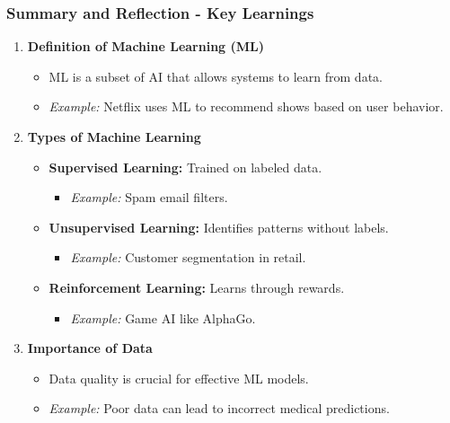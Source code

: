 \documentclass[aspectratio=169]{beamer}
\begin{document}
\begin{frame}[fragile]
  \frametitle{Summary and Reflection - Key Learnings}
  
  \begin{enumerate}
    \item \textbf{Definition of Machine Learning (ML)}
      \begin{itemize}
        \item ML is a subset of AI that allows systems to learn from data.
        \item \textit{Example:} Netflix uses ML to recommend shows based on user behavior.
      \end{itemize}
    
    \item \textbf{Types of Machine Learning}
      \begin{itemize}
        \item \textbf{Supervised Learning:} Trained on labeled data.
          \begin{itemize}
            \item \textit{Example:} Spam email filters.
          \end{itemize}
        \item \textbf{Unsupervised Learning:} Identifies patterns without labels.
          \begin{itemize}
            \item \textit{Example:} Customer segmentation in retail.
          \end{itemize}
        \item \textbf{Reinforcement Learning:} Learns through rewards.
          \begin{itemize}
            \item \textit{Example:} Game AI like AlphaGo.
          \end{itemize}
      \end{itemize}
    
    \item \textbf{Importance of Data}
      \begin{itemize}
        \item Data quality is crucial for effective ML models.
        \item \textit{Example:} Poor data can lead to incorrect medical predictions.
      \end{itemize}
  \end{enumerate}
\end{frame}
\end{document}
